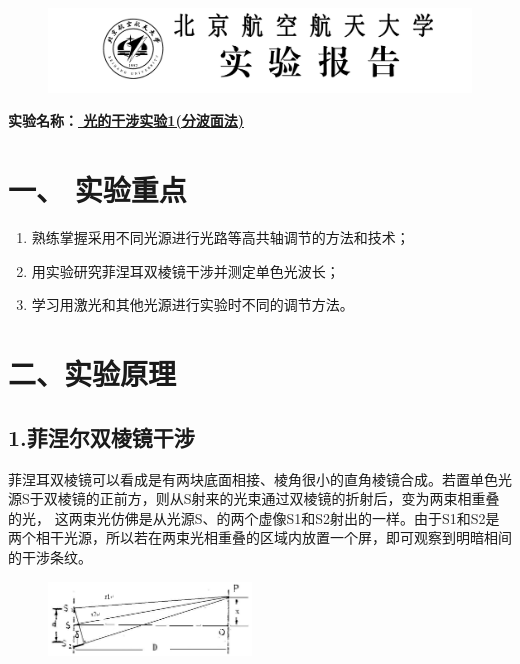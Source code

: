 \documentclass[11pt,a4paper,oneside]{article}
\begin{document}
\begin{figure}[H]
 \centering
  \includegraphics[width=13cm]{表头.png}
\end{figure}
\begin{center}
\textbf{{\large 实验名称：\uline{          光的干涉实验1(分波面法)       }}}
\end{center}

\section*{一、 实验重点}
\begin{enumerate}
 \item 熟练掌握采用不同光源进行光路等高共轴调节的方法和技术；
 \item 用实验研究菲涅耳双棱镜干涉并测定单色光波长；
 \item 学习用激光和其他光源进行实验时不同的调节方法。
\end{enumerate}

\section*{二、实验原理}

\subsection*{1.菲涅尔双棱镜干涉}
菲涅耳双棱镜可以看成是有两块底面相接、棱角很小的直角棱镜合成。若置单色光源S于双棱镜的正前方，则从S射来的光束通过双棱镜的折射后，变为两束相重叠的光，
这两束光仿佛是从光源S、的两个虚像S1和S2射出的一样。由于S1和S2是两个相干光源，所以若在两束光相重叠的区域内放置一个屏，即可观察到明暗相间的干涉条纹。

\begin{figure}
  \vspace{-20pt}
  \begin{center}
    \includegraphics[width=0.48\textwidth]{ExperimentScience.png}
  \end{center}
  \vspace{-20pt}
  \vspace{-10pt}
\end{figure}
\end{document}
